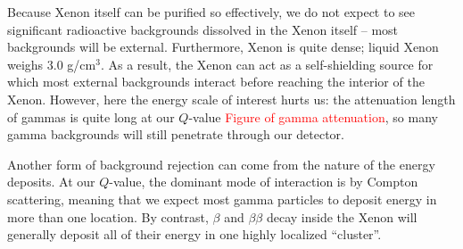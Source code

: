 Because Xenon itself can be purified so effectively, we do not expect to see significant radioactive backgrounds dissolved in the Xenon itself -- most backgrounds will be external.  Furthermore, Xenon is quite dense; liquid Xenon weighs $3.0$ g/cm$^3$.  As a result, the Xenon can act as a self-shielding source for which most external backgrounds interact before reaching the interior of the Xenon.  However, here the energy scale of interest hurts us:  the attenuation length of gammas is quite long at our $Q$-value \textcolor{red}{Figure of gamma attenuation}, so many gamma backgrounds will still penetrate through our detector.

Another form of background rejection can come from the nature of the energy deposits.  At our $Q$-value, the dominant mode of interaction is by Compton scattering, meaning that we expect most gamma particles to deposit energy in more than one location.  By contrast, $\beta$ and $\beta\beta$ decay inside the Xenon will generally deposit all of their energy in one highly localized ``cluster''.

